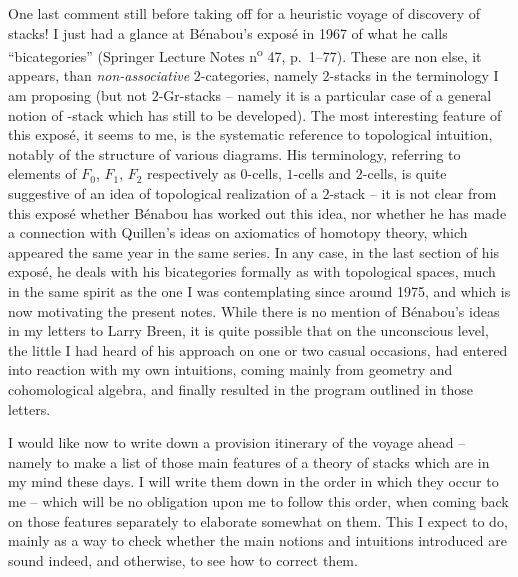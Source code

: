 One last comment still before taking off for a heuristic voyage of
discovery of stacks! I just had a glance at B\'enabou's expos\'e in
1967 of what he calls ``bicategories'' (Springer Lecture Notes
n\textsuperscript{o} 47, p.\ 1--77). These are non else, it appears,
than \emph{non-associative} $2$-categories, namely $2$-stacks in the
terminology I am proposing (but not $2$-Gr-stacks -- namely it is a
particular case of a general notion of \oo-stack which has still to be
developed). The most interesting feature of this expos\'e, it seems to
me, is the systematic reference to topological intuition, notably of
the structure of various diagrams. His terminology, referring to
elements of $F_0$, $F_1$, $F_2$ respectively as $0$-cells, $1$-cells
and $2$-cells, is quite suggestive of an idea of topological
realization of a $2$-stack -- it is not clear from this expos\'e
whether B\'enabou has worked out this idea, nor whether he has made a
connection with Quillen's ideas on axiomatics of homotopy theory,
which appeared the same year in the same series. In any case, in the
last section of his expos\'e, he deals with his bicategories formally
as with topological spaces, much in the same spirit as the one I was
contemplating since around 1975, and which is now motivating the
present notes. While there is no mention of B\'enabou's ideas in my
letters to Larry Breen, it is quite possible that on the unconscious
level, the little I had heard of his approach on one or two casual
occasions, had entered into reaction with my own intuitions, coming
mainly from geometry and cohomological algebra, and finally resulted
in the program outlined in those letters.

\label{sec:19}%
I would like now to write down a provision itinerary of
the voyage ahead -- namely to make a list of those main features of a
theory of stacks which are in my mind these days. I will write them
down in the order in which they occur to me -- which will be no
obligation upon me to follow this order, when coming back on those
features separately to elaborate somewhat on them. This I expect to
do, mainly as a way to check whether the main notions and intuitions
introduced are sound indeed, and otherwise, to see how to correct
them.

